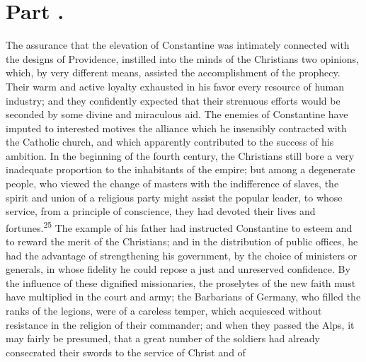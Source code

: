 


\section{Part \thesection.}

The assurance that the elevation of Constantine was intimately
connected with the designs of Providence, instilled into the minds of
the Christians two opinions, which, by very different means, assisted
the accomplishment of the prophecy. Their warm and active loyalty
exhausted in his favor every resource of human industry; and they
confidently expected that their strenuous efforts would be seconded by
some divine and miraculous aid. The enemies of Constantine have imputed
to interested motives the alliance which he insensibly contracted with
the Catholic church, and which apparently contributed to the success of
his ambition. In the beginning of the fourth century, the Christians
still bore a very inadequate proportion to the inhabitants of the
empire; but among a degenerate people, who viewed the change of masters
with the indifference of slaves, the spirit and union of a religious
party might assist the popular leader, to whose service, from a
principle of conscience, they had devoted their lives and fortunes.\textsuperscript{25}
The example of his father had instructed Constantine to esteem and to
reward the merit of the Christians; and in the distribution of public
offices, he had the advantage of strengthening his government, by the
choice of ministers or generals, in whose fidelity he could repose a
just and unreserved confidence. By the influence of these dignified
missionaries, the proselytes of the new faith must have multiplied in
the court and army; the Barbarians of Germany, who filled the ranks of
the legions, were of a careless temper, which acquiesced without
resistance in the religion of their commander; and when they passed the
Alps, it may fairly be presumed, that a great number of the soldiers
had already consecrated their swords to the service of Christ and of
